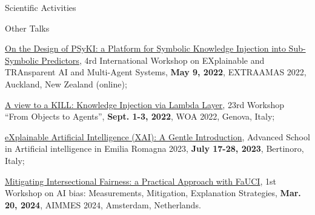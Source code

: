 \documentclass{resume} %
\begin{document}
\begin{rSection}{Scientific Activities}
        \begin{rSubsection}{Other Talks}{}{}{}
            \item \href{https://apice.unibo.it/xwiki/bin/view/Talk/PsykiExtraamas2022}{On the Design of PSyKI: a Platform for Symbolic Knowledge Injection into Sub-Symbolic Predictors}, 4rd International Workshop on EXplainable and TRAnsparent AI and Multi-Agent Systems, \textbf{May 9, 2022}, EXTRAAMAS 2022, Auckland, New Zealand (online);
            \item \href{https://apice.unibo.it/xwiki/bin/view/Talk/KillWoa2022}{A view to a KILL: Knowledge Injection via Lambda Layer}, 23rd Workshop ``From Objects to Agents'', \textbf{Sept. 1-3, 2022}, WOA 2022, Genova, Italy;
            \item \href{https://apice.unibo.it/xwiki/bin/view/Talk/XaiAsaiErBertinoro2023}{eXplainable Artificial Intelligence (XAI): A Gentle Introduction}, Advanced School in Artificial intelligence in Emilia Romagna 2023, \textbf{July 17-28, 2023}, Bertinoro, Italy;
            \item \href{https://apice.unibo.it/xwiki/bin/view/Talk/IntersectionalityAimmes2024}{Mitigating Intersectional Fairness: a Practical Approach with FaUCI}, 1st Workshop on AI bias: Measurements, Mitigation, Explanation Strategies, \textbf{Mar. 20, 2024}, AIMMES 2024, Amsterdam, Netherlands.
        \end{rSubsection}

    \end{rSection}


    
\end{document}
